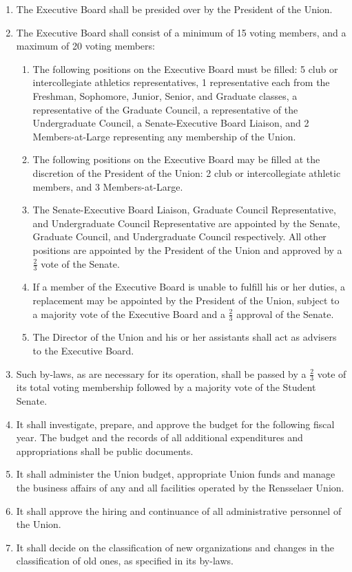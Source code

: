 \begin{enumerate}
\item The Executive Board shall be presided over by the President of the Union.
\item The Executive Board shall consist of a minimum of 15 voting members, and a maximum of 20
voting members:
\begin{enumerate}
\item The following positions on the Executive Board must be filled: 5 club or intercollegiate athletics representatives, 1 representative each from the Freshman, Sophomore, Junior, Senior, and Graduate classes, a representative of the Graduate Council, a representative of the Undergraduate Council, a Senate-Executive Board Liaison, and 2 Members-at-Large representing any membership of the Union.
\item The following positions on the Executive Board may be filled at the discretion of the President of the Union: 2 club or intercollegiate athletic members, and 3 Members-at-Large.
\item The Senate-Executive Board Liaison, Graduate Council Representative, and Undergraduate Council Representative are appointed by the Senate, Graduate Council, and Undergraduate Council respectively. All other positions are appointed by the President of the Union and approved by a $\frac{2}{3}$ vote of the Senate.
\item If a member of the Executive Board is unable to fulfill his or her duties, a replacement may be appointed by the President of the Union, subject to a majority vote of the Executive Board and a $\frac{2}{3}$ approval of the Senate.
\item The Director of the Union and his or her assistants shall act as advisers to the Executive Board.
\end{enumerate}


\item Such by-laws, as are necessary for its operation, shall be passed by a $\frac{2}{3}$ vote of its total voting
membership followed by a majority vote of the Student Senate.
\item It shall investigate, prepare, and approve the budget for the following fiscal year. The budget
and the records of all additional expenditures and appropriations shall be public documents. 
\item It shall administer the Union budget, appropriate Union funds and manage the business affairs
of any and all facilities operated by the Rensselaer Union.
\item It shall approve the hiring and continuance of all administrative personnel of the Union.
\item It shall decide on the classification of new organizations and changes in the classification of old
ones, as specified in its by-laws.
\end{enumerate}

